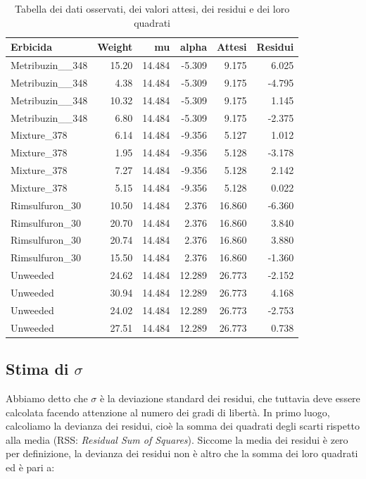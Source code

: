 \documentclass[a4paper,12pt,oneside]{book}
\begin{document}
\begin{table}

\caption{\label{tab:tabResidui}Tabella dei dati osservati, dei valori attesi, dei residui e dei loro quadrati}
\centering
\begin{tabular}[t]{lrrrrr}
\toprule
Erbicida & Weight & mu & alpha & Attesi & Residui\\
\midrule
Metribuzin\_\_348 & 15.20 & 14.484 & -5.309 & 9.175 & 6.025\\
Metribuzin\_\_348 & 4.38 & 14.484 & -5.309 & 9.175 & -4.795\\
Metribuzin\_\_348 & 10.32 & 14.484 & -5.309 & 9.175 & 1.145\\
Metribuzin\_\_348 & 6.80 & 14.484 & -5.309 & 9.175 & -2.375\\
Mixture\_378 & 6.14 & 14.484 & -9.356 & 5.127 & 1.012\\
\addlinespace
Mixture\_378 & 1.95 & 14.484 & -9.356 & 5.128 & -3.178\\
Mixture\_378 & 7.27 & 14.484 & -9.356 & 5.128 & 2.142\\
Mixture\_378 & 5.15 & 14.484 & -9.356 & 5.128 & 0.022\\
Rimsulfuron\_30 & 10.50 & 14.484 & 2.376 & 16.860 & -6.360\\
Rimsulfuron\_30 & 20.70 & 14.484 & 2.376 & 16.860 & 3.840\\
\addlinespace
Rimsulfuron\_30 & 20.74 & 14.484 & 2.376 & 16.860 & 3.880\\
Rimsulfuron\_30 & 15.50 & 14.484 & 2.376 & 16.860 & -1.360\\
Unweeded & 24.62 & 14.484 & 12.289 & 26.773 & -2.152\\
Unweeded & 30.94 & 14.484 & 12.289 & 26.773 & 4.168\\
Unweeded & 24.02 & 14.484 & 12.289 & 26.773 & -2.753\\
\addlinespace
Unweeded & 27.51 & 14.484 & 12.289 & 26.773 & 0.738\\
\bottomrule
\end{tabular}
\end{table}

\hypertarget{stima-di-sigma}{%
\subsection{\texorpdfstring{Stima di \(\sigma\)}{Stima di \textbackslash sigma}}\label{stima-di-sigma}}

Abbiamo detto che \(\sigma\) è la deviazione standard dei residui, che tuttavia deve essere calcolata facendo attenzione al numero dei gradi di libertà. In primo luogo, calcoliamo la devianza dei residui, cioè la somma dei quadrati degli scarti rispetto alla media (RSS: \emph{Residual Sum of Squares}). Siccome la media dei residui è zero per definizione, la devianza dei residui non è altro che la somma dei loro quadrati ed è pari a:
\end{document}
